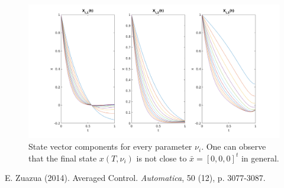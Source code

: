 \documentclass[10pt,a4paper]{article}
\begin{document}
\begin{figure}[h]
  \centering
      \includegraphics[width=1\textwidth]{xi.png}
  \caption{State vector components for every parameter $\nu_i$. One can observe that the final state $x\left(T, \nu_i \right)$ is not close to $\bar{x}=[0,0,0]^t$ in general.}
\end{figure}

\begin{thebibliography}{1}
E. Zuazua (2014). Averaged Control. \textit{Automatica}, 50 (12), p. 3077-3087.
\end{thebibliography}
\end{document}

